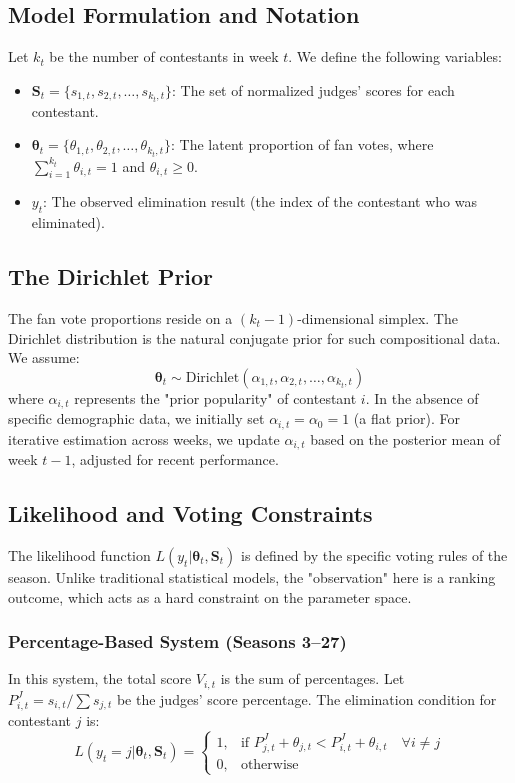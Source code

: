\documentclass[12pt]{article}
\begin{document}
\subsection{Model Formulation and Notation}
Let $k_t$ be the number of contestants in week $t$. We define the following variables:
\begin{itemize}
    \item $\mathbf{S}_t = \{s_{1,t}, s_{2,t}, \dots, s_{k_t,t}\}$: The set of normalized judges' scores for each contestant.
    \item $\bm{\theta}_t = \{\theta_{1,t}, \theta_{2,t}, \dots, \theta_{k_t,t}\}$: The latent proportion of fan votes, where $\sum_{i=1}^{k_t} \theta_{i,t} = 1$ and $\theta_{i,t} \ge 0$.
    \item $y_t$: The observed elimination result (the index of the contestant who was eliminated).
\end{itemize}

\subsection{The Dirichlet Prior}
The fan vote proportions reside on a $(k_t-1)$-dimensional simplex. The Dirichlet distribution is the natural conjugate prior for such compositional data. We assume:
\begin{equation}
    \bm{\theta}_t \sim \text{Dirichlet}(\alpha_{1,t}, \alpha_{2,t}, \dots, \alpha_{k_t,t})
\end{equation}
where $\alpha_{i,t}$ represents the "prior popularity" of contestant $i$. In the absence of specific demographic data, we initially set $\alpha_{i,t} = \alpha_0 = 1$ (a flat prior). For iterative estimation across weeks, we update $\alpha_{i,t}$ based on the posterior mean of week $t-1$, adjusted for recent performance.

\subsection{Likelihood and Voting Constraints}
The likelihood function $L(y_t | \bm{\theta}_t, \mathbf{S}_t)$ is defined by the specific voting rules of the season. Unlike traditional statistical models, the "observation" here is a ranking outcome, which acts as a hard constraint on the parameter space.

\subsubsection{Percentage-Based System (Seasons 3--27)}
In this system, the total score $V_{i,t}$ is the sum of percentages. Let $P^J_{i,t} = s_{i,t} / \sum s_{j,t}$ be the judges' score percentage. The elimination condition for contestant $j$ is:
\begin{equation}
    L(y_t=j | \bm{\theta}_t, \mathbf{S}_t) = 
    \begin{cases} 
    1, & \text{if } P^J_{j,t} + \theta_{j,t} < P^J_{i,t} + \theta_{i,t} \quad \forall i \neq j \\
    0, & \text{otherwise}
    \end{cases}
\end{equation}
\end{document}
